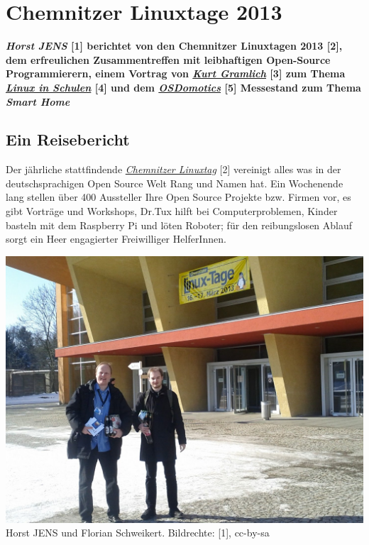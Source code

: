 \section*{Chemnitzer Linuxtage 2013}
\hypertarget{chemnitz}{}
\label{chemnitz}
\textbf{\textit{Horst JENS} [1] berichtet von den Chemnitzer Linuxtagen 2013 [2], dem erfreulichen Zusammentreffen mit leibhaftigen Open-Source Programmierern, einem Vortrag von \href{http://wiki.skolelinux.de/KurtGramlich/Biografie}{\textit{Kurt Gramlich}} [3] zum Thema \href{http://goo.gl/EoIDpy}{\textit{Linux in Schulen}} [4] und dem \href{http://osdomotics.com}{\textit{OSDomotics}}  [5] Messestand zum Thema \textit{Smart Home}}

\subsection*{Ein Reisebericht}

Der jährliche stattfindende \href{http://chemnitzer.linux-tage.de/2013/}{\textit{Chemnitzer Linuxtag}} [2] vereinigt alles was in der deutschsprachigen Open Source Welt Rang und Namen hat. Ein Wochenende  lang stellen über 400 Aussteller Ihre Open Source Projekte bzw. Firmen vor, es gibt Vorträge und Workshops, Dr.Tux hilft bei Computerproblemen, Kinder basteln mit dem Raspberry Pi und löten Roboter; für den reibungslosen Ablauf sorgt ein Heer engagierter Freiwilliger HelferInnen.

\begin{center}
\includegraphics[width=\linewidth]{chemnitz/chemnitz_eroeffnung.jpg}
\footnotesize{Horst JENS und Florian Schweikert. Bildrechte: [1], cc-by-sa}
\end{center}

